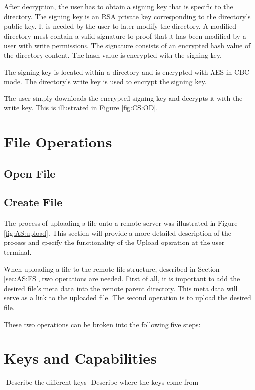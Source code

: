 \documentclass[pdftex,english,10pt,b5paper,twoside]{book}
\begin{document}
After decryption, the user has to obtain a signing key that is specific to the
directory. The signing key is an RSA private key corresponding to the
directory's public key. It is needed by the user to later modify the directory.
A modified directory must contain a valid signature to proof that it has been
modified by a user with write permissions. The signature consists of an encrypted 
hash value of the directory content. The hash value is encrypted with the
signing key.

The signing key is located within a directory and is encrypted with AES in CBC
mode. The directory's write key is used to encrypt the signing key.

The user simply downloads the encrypted signing key and decrypts it with the
write key. This is illustrated in Figure \ref{fig:CS:OD}.


\section{File Operations}

\subsection{Open File}

\subsection{Create File}

The process of uploading a file onto a remote server was illustrated in Figure
\ref{fig:AS:upload}. This section will provide a more detailed description of the
process and specify the functionality of the Upload operation at the user
terminal.

When uploading a file to the remote file structure, described in Section \ref{sec:AS:FS}, two
operations are needed. First of all, it is important to add the desired file's
meta data into the remote parent directory. This meta data will serve as a link
to the uploaded file. The second operation is to upload the desired file.

These two operations can be broken into the following five steps:

\section{Keys and Capabilities}
\label{sec:CS:KAC}
-Describe the different keys
-Describe where the keys come from
\end{document}
